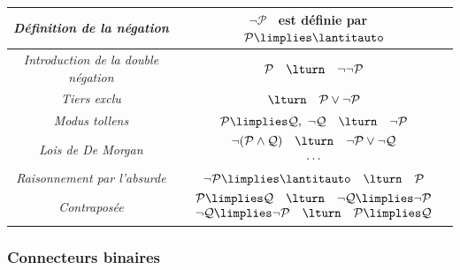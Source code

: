 \documentclass[11pt,class=report,crop=false]{standalone}
\begin{document}
\begin{center}
\begin{tabular}{|c|c|}
		\emph{Définition de la négation} 
		& $\lnot\mathcal{P}$ \ est définie par \ $\mathcal{P}\limplies\lantitauto$ \\ \hline
		
		\emph{Introduction de la double négation}
		& $\mathcal{P} \quad \lturn \quad \lnot\lnot\mathcal{P}$ \\ \hline
		
		\emph{Tiers exclu} 
		& $\lturn \quad \mathcal{P}\lor\lnot\mathcal{P}$ \\ \hline
		
		\emph{Modus tollens} 
		& $\mathcal{P}\limplies\mathcal{Q},\ \lnot\mathcal{Q} \quad \lturn \quad \lnot\mathcal{P}$ \\ \hline
		
		\emph{Lois de De Morgan} 
		& $\begin{array}{c}
			\lnot(\mathcal{P}\land\mathcal{Q}) \quad \lturn \quad \lnot\mathcal{P}\lor\lnot\mathcal{Q} \\
			\ldots		
		\end{array}$\\ \hline
		
		\emph{Raisonnement par l'absurde} 
		& $\lnot\mathcal{P}\limplies\lantitauto \quad \lturn \quad \mathcal{P}$ \\ \hline
		
		\emph{Contraposée} 
		& $\begin{array}{c}		
			\mathcal{P}\limplies\mathcal{Q} \quad \lturn \quad \lnot\mathcal{Q}\limplies\lnot\mathcal{P} \\ 
			\lnot\mathcal{Q}\limplies\lnot\mathcal{P} \quad \lturn \quad \mathcal{P}\limplies\mathcal{Q} \\ 		
		\end{array}$\\\hline
	\end{tabular}
\end{center}

\subsubsection{Connecteurs binaires}
\end{document}
